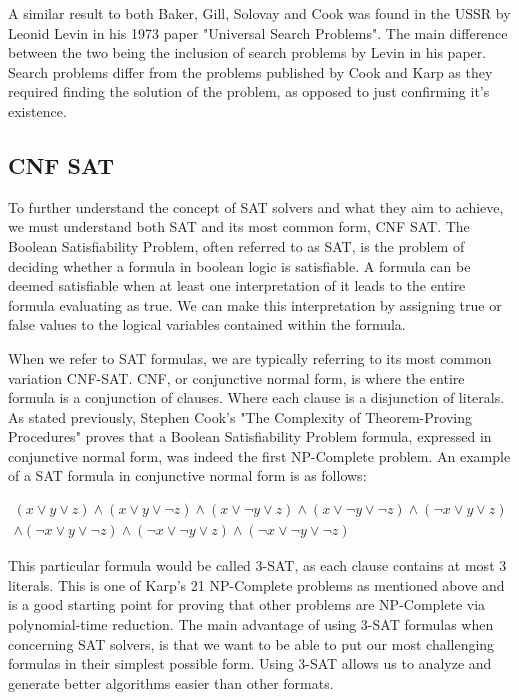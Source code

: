 \documentclass{article}
\begin{document}
A similar result to both Baker, Gill, Solovay and Cook was found in the USSR by Leonid Levin in his 1973 paper "Universal Search
Problems"\cite{levin}. The main difference between the two being the inclusion of search problems by Levin in his paper. Search problems differ from
the problems published by Cook and Karp as they required finding the solution of the problem, as opposed to just confirming it's
existence.

\subsection{CNF SAT}
To further understand the concept of SAT solvers and what they aim to achieve, we must understand both SAT and its most common form, CNF
SAT. The Boolean Satisfiability Problem, often referred to as SAT, is the problem of deciding whether a formula in boolean logic is
satisfiable. A formula can be deemed satisfiable when at least one interpretation of it leads to the entire formula evaluating as true. We
can make this interpretation by assigning true or false values to the logical variables contained within the formula.

When we refer to SAT formulas, we are typically referring to its most common variation CNF-SAT. CNF, or conjunctive normal form, is where
the entire formula is a conjunction of clauses. Where each clause is a disjunction of literals. As stated previously, Stephen Cook's "The
Complexity of Theorem-Proving Procedures" proves that a Boolean Satisfiability Problem formula, expressed in conjunctive normal form, was
indeed the first NP-Complete problem\cite{scook}. An example of a SAT formula in conjunctive normal form is as follows:

\begin{gather*}
    (x\vee y\vee z)\wedge (x\vee y\vee \neg z)\wedge (x\vee \neg y\vee z)\wedge(x\vee \neg y\vee \neg z)\wedge(\neg x\vee y\vee
    z) \\ \wedge(\neg x\vee y\vee \neg z)\wedge(\neg x\vee \neg y\vee z)\wedge(\neg x\vee \neg y\vee \neg z)
\end{gather*}

This particular formula would be called 3-SAT, as each clause contains at most 3 literals. This is one of Karp's 21 NP-Complete problems as
mentioned above and is a good starting point for proving that other problems are NP-Complete via polynomial-time reduction. The main
advantage of using 3-SAT formulas when concerning SAT solvers, is that we want to be able to put our most challenging formulas in their
simplest possible form. Using 3-SAT allows us to analyze and generate better algorithms easier than other formats.
\end{document}
